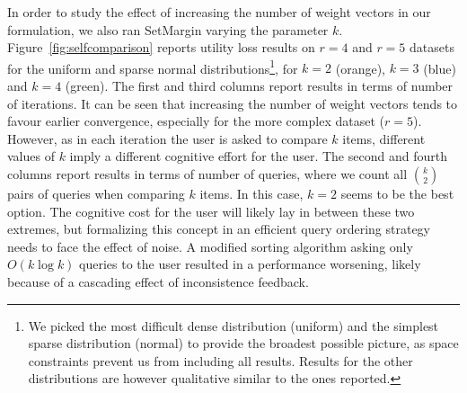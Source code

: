 \documentclass{article}
\renewcommand\[{\begin{equation}}
\renewcommand\]{\end{equation}}
\newcommand{\vecvar}[1]{\ensuremath{\boldsymbol{#1}}}
\newcommand{\vx}{\vecvar{x}}
\newcommand{\stefano}[1]{{\bf \textcolor{green}{{\fbox{Stefano:} #1}}}}
\begin{document}
In order to study the effect of increasing the number of weight
vectors in our formulation, we also ran {\sc SetMargin} varying the
parameter $k$. Figure~\ref{fig:selfcomparison} reports utility loss
results on $r=4$ and $r=5$ datasets for the uniform and sparse normal
distributions\footnote{We picked the most difficult dense distribution
  (uniform) and the simplest sparse distribution (normal) to provide
  the broadest possible picture, as space constraints prevent us from
  including all results. Results for the other distributions are
  however qualitative similar to the ones reported.}, for $k=2$
(orange), $k=3$ (blue) and $k=4$ (green). The first and third columns
report results in terms of number of iterations. It can be seen that
increasing the number of weight vectors tends to favour earlier
convergence, especially for the more complex dataset ($r=5$). However,
as in each iteration the user is asked to compare $k$ items, different
values of $k$ imply a different cognitive effort for the user. The
second and fourth columns report results in terms of number of
queries, where we count all $k \choose 2$ pairs of queries when
comparing $k$ items. In this case, $k=2$ seems to be the best
option. The cognitive cost for the user will likely lay in between
these two extremes, but formalizing this concept in an efficient query
ordering strategy needs to face the effect of noise.  A modified
sorting algorithm asking only $O(k\log k)$ queries to the user
resulted in a performance worsening, likely because of a cascading
effect of inconsistence feedback.


\end{document}
